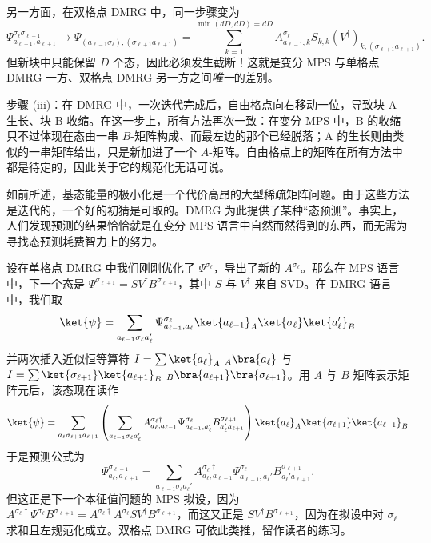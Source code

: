 另一方面，在双格点 DMRG 中，同一步骤变为
\begin{equation}
\Psi^{\sigma_ \ell\sigma_{\ell +1}}_{a_{\ell-1},a_{\ell +1}} \rightarrow \Psi_{(a_{\ell-1} \sigma_ \ell), (\sigma_{\ell +1} a_{\ell +1})} = \sum_{k=1}^{\min(dD,dD)=dD} A^{\sigma_ \ell}_{a_{\ell-1},k} S_{k,k} (V^\dagger)_{k,(\sigma_{\ell +1} a_{\ell +1})} .
\end{equation}
但新块中只能保留 $D$ 个态，因此必须发生截断！这就是变分 MPS 与单格点 DMRG 一方、双格点 DMRG 另一方之间{\em 唯一}的差别。

步骤 (iii)：在 DMRG 中，一次迭代完成后，自由格点向右移动一位，导致块 A 生长、块 B 收缩。在这一步上，所有方法再次一致：在变分 MPS 中，B 的收缩只不过体现在态由一串 $B$-矩阵构成、而最左边的那个已经脱落；A 的生长则由类似的一串矩阵给出，只是新加进了一个 $A$-矩阵。自由格点上的矩阵在所有方法中都是待定的，因此关于它的规范化无话可说。

如前所述，基态能量的极小化是一个代价高昂的大型稀疏矩阵问题。由于这些方法是迭代的，一个好的初猜是可取的。DMRG 为此提供了某种``态预测''\cite{White96}。事实上，人们发现预测的结果恰恰就是在变分 MPS 语言中自然而然得到的东西，而无需为寻找态预测耗费智力上的努力。

设在单格点 DMRG 中我们刚刚优化了 $\Psi^{\sigma_\ell}$，导出了新的 $A^{\sigma_ \ell}$。那么在 MPS 语言中，下一个态是 $\Psi^{\sigma_{\ell +1}}= SV^{\dagger} B^{\sigma_{\ell +1}}$，其中 $S$ 与 $V^\dagger$ 来自 SVD。在 DMRG 语言中，我们取
\begin{equation}
\ket{\psi} = \sum_{a_{\ell-1}\sigma_ \ell a_{\ell }'} \Psi^{\sigma_ \ell}_{a_{\ell-1}, a_{\ell }} \ket{a_{\ell-1}}_A \ket{\sigma_ \ell} \ket{a_{\ell}'}_B
\end{equation}
并两次插入近似恒等算符 $I= \sum \ket{a_ \ell}_A\phantom\langle_A\bra{a_ \ell}$ 与
$I= \sum \ket{\sigma_{\ell +1}}\ket{a_{\ell+1}}_B \phantom\langle_B\bra{a_{\ell +1}} \bra{\sigma_{\ell+1}}$。用 $A$ 与 $B$ 矩阵表示矩阵元后，该态现在读作
\begin{equation}
\ket{\psi} = \sum_{a_\ell\sigma_{\ell +1} a_{\ell +1}} \left( \sum_{a_{\ell-1}\sigma_ \ell  a_{\ell}'} 
A^{\sigma_ \ell \dagger}_{a_ \ell,a_{\ell-1}} \Psi^{\sigma_ \ell}_{a_{\ell-1}, a_{\ell}'}  B^{\sigma_{\ell +1}}_{a_{\ell}' a_{\ell +1}} \right) 
\ket{a_{\ell}}_A \ket{\sigma_{\ell +1}} \ket{a_{\ell +1}}_B
\end{equation}
于是预测公式为
\begin{equation}
\Psi^{\sigma_{\ell +1}}_{a_{\ell}, a_{\ell+1}} = 
\sum_{a_{\ell-1}\sigma_ \ell a_{\ell}'} 
A^{\sigma_ \ell \dagger}_{a_ \ell,a_{\ell-1}} \Psi^{\sigma_ \ell}_{a_{\ell-1}, a_{\ell}'}  B^{\sigma_{\ell +1}}_{a_{\ell}' a_{\ell +1}} .
\end{equation}
但这正是下一个本征值问题的 MPS 拟设，因为 $ A^{\sigma_ \ell \dagger} \Psi^{\sigma_ \ell}  B^{\sigma_{\ell +1}} =
A^{\sigma_ \ell \dagger} A^{\sigma_ \ell } S V^{\dagger} B^{\sigma_{\ell +1}}$，而这又正是
$S V^{\dagger} B^{\sigma_{\ell +1}}$，因为在拟设中对 $\sigma_ \ell $ 求和且左规范化成立。双格点 DMRG 可依此类推，留作读者的练习。

